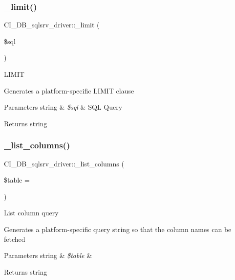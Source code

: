 \subsubsection{\texorpdfstring{\+\_\+limit()}{\_limit()}}
{\footnotesize\ttfamily C\+I\+\_\+\+D\+B\+\_\+sqlsrv\+\_\+driver\+::\+\_\+limit (\begin{DoxyParamCaption}\item[{}]{\$sql }\end{DoxyParamCaption})\hspace{0.3cm}{\ttfamily [protected]}}

L\+I\+M\+IT

Generates a platform-\/specific L\+I\+M\+IT clause


\begin{DoxyParams}[1]{Parameters}
string & {\em \$sql} & S\+QL Query \\
\hline
\end{DoxyParams}
\begin{DoxyReturn}{Returns}
string 
\end{DoxyReturn}
\mbox{\label{class_c_i___d_b__sqlsrv__driver_adbc13aa538ae09cbb35b0600772bc2eb}} 
\subsubsection{\texorpdfstring{\+\_\+list\+\_\+columns()}{\_list\_columns()}}
{\footnotesize\ttfamily C\+I\+\_\+\+D\+B\+\_\+sqlsrv\+\_\+driver\+::\+\_\+list\+\_\+columns (\begin{DoxyParamCaption}\item[{}]{\$table = {\ttfamily \textquotesingle{}\textquotesingle{}} }\end{DoxyParamCaption})\hspace{0.3cm}{\ttfamily [protected]}}

List column query

Generates a platform-\/specific query string so that the column names can be fetched


\begin{DoxyParams}[1]{Parameters}
string & {\em \$table} & \\
\hline
\end{DoxyParams}
\begin{DoxyReturn}{Returns}
string 
\end{DoxyReturn}
\mbox{\label{class_c_i___d_b__sqlsrv__driver_a77feb46ae9982dad8d0eeea98c20c69c}} 
